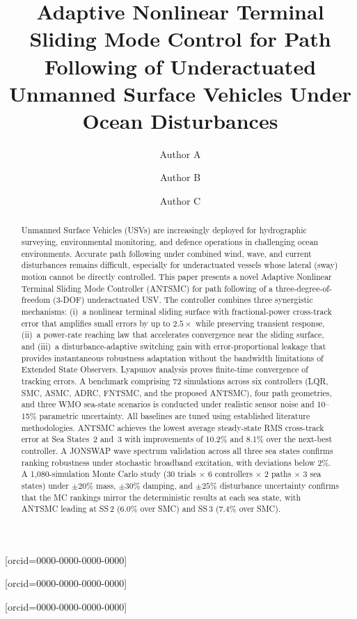 \documentclass[review]{cas-dc}
\begin{document}
\let\WriteBookmarks\relax
\def\floatpagepagefraction{1}
\def\textpagefraction{.001}


\title[mode=title]{Adaptive Nonlinear Terminal Sliding Mode Control for Path Following of Underactuated Unmanned Surface Vehicles Under Ocean Disturbances}

\author[1]{Author A}[orcid=0000-0000-0000-0000]

\author[1]{Author B\cormark[1]}[orcid=0000-0000-0000-0000]

\author[1]{Author C}[orcid=0000-0000-0000-0000]



\begin{abstract}
Unmanned Surface Vehicles (USVs) are increasingly deployed for hydrographic surveying, environmental monitoring, and defence operations in challenging ocean environments. Accurate path following under combined wind, wave, and current disturbances remains difficult, especially for underactuated vessels whose lateral (sway) motion cannot be directly controlled. This paper presents a novel Adaptive Nonlinear Terminal Sliding Mode Controller (ANTSMC) for path following of a three-degree-of-freedom (3-DOF) underactuated USV. The controller combines three synergistic mechanisms: (i)~a nonlinear terminal sliding surface with fractional-power cross-track error that amplifies small errors by up to $2.5\times$ while preserving transient response, (ii)~a power-rate reaching law that accelerates convergence near the sliding surface, and (iii)~a disturbance-adaptive switching gain with error-proportional leakage that provides instantaneous robustness adaptation without the bandwidth limitations of Extended State Observers. Lyapunov analysis proves finite-time convergence of tracking errors. A benchmark comprising 72 simulations across six controllers (LQR, SMC, ASMC, ADRC, FNTSMC, and the proposed ANTSMC), four path geometries, and three WMO sea-state scenarios is conducted under realistic sensor noise and 10--15\% parametric uncertainty. All baselines are tuned using established literature methodologies. ANTSMC achieves the lowest average steady-state RMS cross-track error at Sea States~2 and~3 with improvements of 10.2\% and 8.1\% over the next-best controller. A JONSWAP wave spectrum validation across all three sea states confirms ranking robustness under stochastic broadband excitation, with deviations below 2\%. A 1{,}080-simulation Monte Carlo study (30 trials $\times$ 6 controllers $\times$ 2 paths $\times$ 3 sea states) under $\pm 20\%$ mass, $\pm 30\%$ damping, and $\pm 25\%$ disturbance uncertainty confirms that the MC rankings mirror the deterministic results at each sea state, with ANTSMC leading at SS\,2 (6.0\% over SMC) and SS\,3 (7.4\% over SMC).
\end{abstract}
\end{document}
